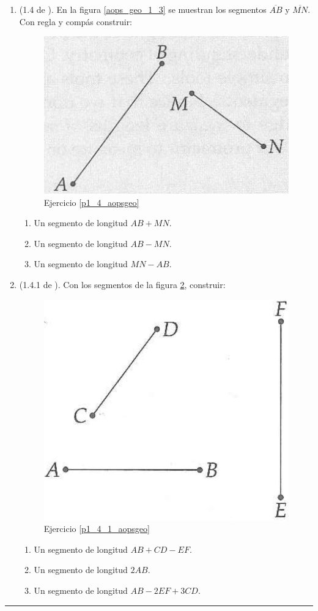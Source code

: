 \begin{act_clase}
\begin{enumerate}
		\item \label{p1_4_aopsgeo}(1.4 de \cite{Aops_Geometria}). En la figura \ref{aops_geo_1_3} se muestran los segmentos $\overline{AB}$ y $\overline{MN}$. Con regla y compás construir:
			\begin{figure}[H]
				\centering
				\includegraphics[width=0.5\linewidth]{Geometria/imgs/aops_geo_1_4}
				\caption{Ejercicio \ref{p1_4_aopsgeo}}
				\label{aops_geo_1_4}
			\end{figure}
		\begin{enumerate}[label=\Alph*)]
				\item Un segmento de longitud $AB+MN$. \vspace{6cm}
				\item Un segmento de longitud $AB-MN$. \vspace{7cm}
				\item Un segmento de longitud $MN-AB$. \vspace{7cm}				
		\end{enumerate}

		\item \label{p1_4_1_aopsgeo} (1.4.1 de \cite{Aops_Geometria}). Con los segmentos de la figura \ref{aops_geo_1_4_1}, construir:
			\begin{figure}[H]
				\centering
				\includegraphics[width=0.3\linewidth]{Geometria/imgs/aops_geo_1_4_1}
				\caption{Ejercicio \ref{p1_4_1_aopsgeo}}
				\label{aops_geo_1_4_1}
			\end{figure}
			\begin{enumerate}[label=\Alph*)]
				\item Un segmento de longitud $AB+CD-EF$. \vspace{6cm}
				\item Un segmento de longitud $2AB$. \vspace{6cm}
				\item Un segmento de longitud $AB-2EF+3CD$. \vspace{5cm}				
			\end{enumerate}
		
	\end{enumerate}
\end{act_clase}
\rule{\textwidth}{0.1mm}
\newpage


